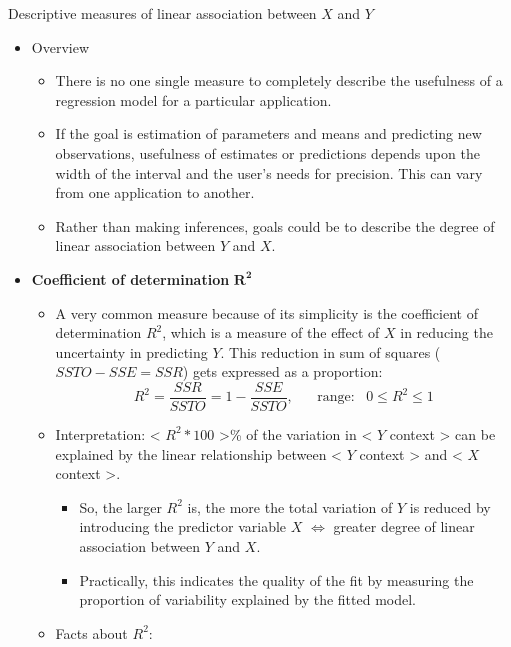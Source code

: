 \documentclass{article}
\begin{document}
Descriptive measures of linear association between $X$ and $Y$\bigskip
\begin{itemize}
    \item Overview
    \begin{itemize}
        \item There is no one single measure to completely describe the usefulness of a regression model for a particular application.
        \item If the goal is estimation of parameters and means and predicting new observations, usefulness of estimates or predictions depends upon the width of the interval and the user's needs for precision. This can vary from one application to another.
        \item Rather than making inferences, goals could be to describe the degree of linear association between $Y$ and $X$.
    \end{itemize}
    \item \textbf{Coefficient of determination} $\boldsymbol{R^2}$
    \begin{itemize}
        \item A very common measure because of its simplicity is the coefficient of determination $R^2$, which is a measure of the effect of $X$ in reducing the uncertainty in predicting $Y$. This reduction in sum of squares ($SSTO - SSE = SSR$) gets expressed as a proportion:
        \[
        R^2 = \frac{SSR}{SSTO} = 1-\frac{SSE}{SSTO}, \hspace{20pt} \text{range:} \hspace{10pt} 0 \le R^2 \le 1
        \]\vspace{90pt}
        \item Interpretation: < $R^2 *100$ >\% of the variation in < $Y$ context > can be explained by the linear relationship between < $Y$ context > and < $X$ context >.
        \begin{itemize}
            \item So, the larger $R^2$ is, the more the total variation of $Y$ is reduced by introducing the predictor variable $X$ $\Longleftrightarrow$ greater degree of linear association between $Y$ and $X$.
            \item Practically, this indicates the quality of the fit by measuring the proportion of variability explained by the fitted model.
        \end{itemize}
        \item Facts about $R^2$:
        \begin{itemize}

\end{itemize}
\end{itemize}
\end{itemize}
\end{document}

